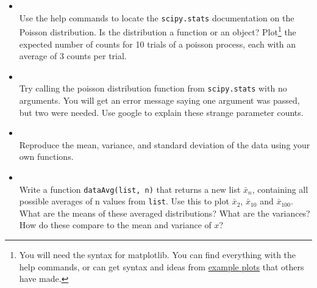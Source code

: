 \documentclass[justified, nobib]{tufte-handout}
\newcommand{\matplotlibGalleryLink}{http://matplotlib.org/gallery.html}
\newcommand{\matplotlibGalleryNote}{\footnote{You will need the syntax for
      matplotlib. You can find everything with the help commands, or can get
      syntax and ideas from \href{\matplotlibGalleryLink}{example plots} that
      others have made.}}
\begin{document}
\begin{itemize}
\item[]  \\
  Use the help commands to locate the \texttt{scipy.stats} documentation on the
  Poisson distribution. Is the distribution a function or an object?
  Plot\matplotlibGalleryNote{} \;the expected number of counts for 10 trials of a
  poisson process, each with an average of 3 counts per trial.

\item[]  \\
  Try calling the poisson distribution function from \texttt{scipy.stats} with
  no arguments. You will get an error message saying one argument was passed,
  but two were needed. Use google to explain these strange parameter counts.

\item[]  \\
  Reproduce the mean, variance, and standard deviation of the data using your
  own functions.




\item[]
 \\
  Write a function \texttt{dataAvg(list, n)} that returns a new list
  $\bar{x}_n$, containing all possible averages of n values from
  \texttt{list}. Use this to plot $\bar{x}_2$, $\bar{x}_{10}$ and
  $\bar{x}_{100}$. What are the means of these averaged distributions? What are
  the variances? How do these compare to the mean and variance of $x$?
\end{itemize}
\end{document}
